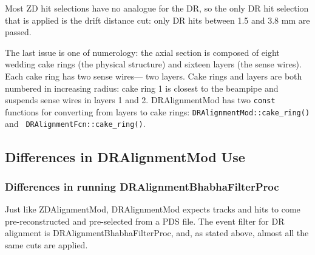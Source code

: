 \documentclass[12pt]{article}
\begin{document}
Most ZD hit selections have no analogue for the DR, so the only DR hit
selection that is applied is the drift distance cut: only DR hits
between 1.5 and 3.8 mm are passed.

The last issue is one of numerology: the axial section is composed of
eight wedding cake rings (the physical structure) and sixteen layers
(the sense wires).  Each cake ring has two sense wires--- two layers.
Cake rings and layers are both numbered in increasing radius: cake
ring 1 is closest to the beampipe and suspends sense wires in layers 1
and 2.  DRAlignmentMod has two {\tt const} functions for converting
from layers to cake rings: {\tt DRAlignmentMod::cake\_ring()} and {\tt
DRAlignmentFcn::cake\_ring()}.

\subsection{Differences in DRAlignmentMod Use}

\subsubsection{Differences in running DRAlignmentBhabhaFilterProc}

Just like ZDAlignmentMod, DRAlignmentMod expects tracks and hits to
come pre-reconstructed and pre-selected from a PDS file.  The event
filter for DR alignment is DRAlignmentBhabhaFilterProc, and, as stated
above, almost all the same cuts are applied.
\end{document}
